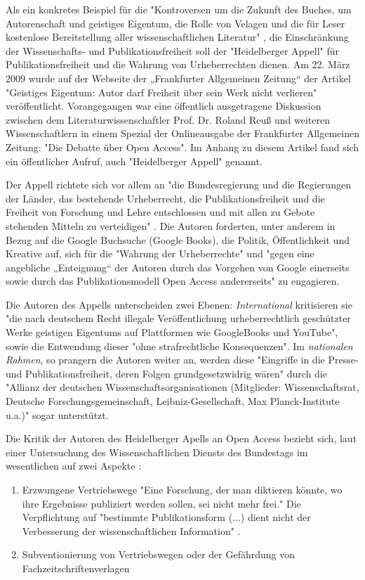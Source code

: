 Als ein konkretes Beispiel für die "Kontroversen um die Zukunft des Buches, um Autorenschaft und geistiges Eigentum, die Rolle von Velagen und die für Leser kostenlose Bereitstellung aller wissenschaftlichen Literatur" \cite{hagner_2015_sache_buches}, die Einschränkung der Wissenschafts- und Publikationsfreiheit soll der "Heidelberger Appell" für Publikationsfreiheit und die Wahrung von Urheberrechten dienen. Am 22. März 2009 wurde auf der Webseite der „Frankfurter Allgemeinen Zeitung“ der Artikel "Geistiges Eigentum: Autor darf Freiheit über sein Werk nicht verlieren" \cite{faz_heidelberger_apell_2009} veröffentlicht. Vorangegangen war eine öffentlich ausgetragene Diskussion zwischen dem Literaturwissenschaftler Prof. Dr. Roland Reuß und weiteren Wissenschaftlern in einem Spezial der Onlineausgabe der Frankfurter Allgemeinen Zeitung: "Die Debatte über Open Access". Im Anhang zu diesem Artikel fand sich ein öffentlicher Aufruf, auch "Heidelberger Appell" genannt.

Der Appell richtete sich vor allem an "die Bundesregierung und die Regierungen der Länder, das bestehende Urheberrecht, die Publikationsfreiheit und die Freiheit von Forschung und Lehre entschlossen und mit allen zu Gebote stehenden Mitteln zu verteidigen" \cite{ITK_2009}. Die Autoren forderten, unter anderem in Bezug auf die Google Buchsuche (Google Books), die Politik, Öffentlichkeit und Kreative auf, sich für die "Wahrung der Urheberrechte" und "gegen eine angebliche „Enteignung“ der Autoren durch das Vorgehen von Google einerseits sowie durch das Publikationsmodell Open Access andererseits" \cite{WD_bundestag_2009} zu engagieren.

Die Autoren des Appells unterscheiden zwei Ebenen: \textit{International} kritisieren sie "die nach deutschem Recht illegale Veröffentlichung urheberrechtlich geschützter Werke geistigen Eigentums auf Plattformen wie GoogleBooks und YouTube", sowie die Entwendung dieser "ohne strafrechtliche Konsequenzen". Im \textit{nationalen Rahmen}, so prangern die Autoren weiter an, werden diese "Eingriffe in die Presse- und Publikationsfreiheit, deren Folgen grundgesetzwidrig wären" durch die "Allianz der deutschen Wissenschaftsorganisationen (Mitglieder: Wissenschaftsrat, Deutsche Forschungsgemeinschaft, Leibniz-Gesellschaft, Max Planck-Institute u.a.)" sogar unterstützt.\cite{ITK_2009}

Die Kritik der Autoren des Heidelberger Apells an Open Access bezieht sich, laut einer Untersuchung des Wissenschaftlichen Diensts des Bundestags im wesentlichen auf zwei Aspekte \cite{WD_bundestag_2009}:
\begin{enumerate}
\item Erzwungene Vertriebswege
"Eine Forschung, der man diktieren könnte, wo ihre Ergebnisse publiziert werden sollen, sei nicht mehr frei." Die Verpflichtung auf "bestimmte Publikationsform (...) dient nicht der Verbesserung der wissenschaftlichen Information" \cite{ITK_2009}.
\item Subventionierung von Vertriebswegen oder der Gefährdung von Fachzeitschriftenverlagen
\end{enumerate}

